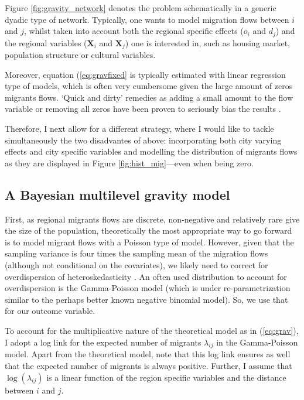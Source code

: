 \documentclass[fleqn,10pt]{SelfArx} %
\begin{document}
        Figure \ref{fig:gravity_network} denotes the problem schematically in a generic dyadic type of network. Typically, one wants to model migration flows between $i$ and $j$, whilst taken into account both the regional specific effects ($o_i$ and $d_j$) and the regional variables ($\mathbf{X}_i$ and $\mathbf{X}_j$) one is interested  in, such as housing market, population structure or cultural variables. 
                  
        Moreover, equation
        (\ref{eq:gravfixed} is typically estimated with linear regression
        type of models, which is often very cumbersome given the large
        amount of zeros migrants flows. `Quick and dirty' remedies as adding a small amount to the flow variable or removing all zeros have been proven to seriously bias the results \citep{linders2006estimation, burger2009specification}.
        	

        Therefore, I next allow for a different strategy, where I
        would like to tackle simultaneously the two disadvantes of above:
        incorporating both city varying effects and city specific variables and
        modelling the distribution of migrants flows as they are
        displayed in Figure \ref{fig:hist_mig}---even when being zero.

        \subsection{A Bayesian multilevel gravity model}

        First, as regional migrants flows are discrete, non-negative and
        relatively rare give the size of the population, theoretically the most
        appropriate way to go forward is to model migrant flows
        with a Poisson type of model. However, given that the sampling
        variance is four times the sampling mean of the migration
        flows (although not conditional on the covariates), we likely
        need to correct for overdispersion of heteroskedasticity
        \citep[][states that heteroskedasticity (rather than the
        presence of too many zeros) is responsible for the main
        source of bias within gravity models.]{silva2006log}. An often used distribution to
        account for overdispersion is the Gamma-Poisson model (which is under re-parametrization
        similar to the perhaps better known negative binomial model). So, we use that for our
        outcome variable.

        To account for the multiplicative nature of the theoretical
        model as in (\ref{eq:grav}), I adopt a log link for the
        expected number of migrants $\lambda_{ij}$ in the Gamma-Poisson model. 
        Apart from the theoretical model, note that this log link ensures 
        as well that the expected number of migrants is always positive. 
        Further, I assume that $\log(\lambda_{ij})$ is a linear function 
        of the region specific variables and the distance between $i$ and $j$.
\end{document}
